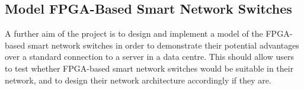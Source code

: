 \subsection{Model FPGA-Based Smart Network Switches}
A further aim of the project is to design and implement a model of the FPGA-based smart network switches in order to demonstrate their potential advantages over a standard connection to a server in a data centre. This should allow users to test whether FPGA-based smart network switches would be suitable in their network, and to design their network architecture accordingly if they are.
